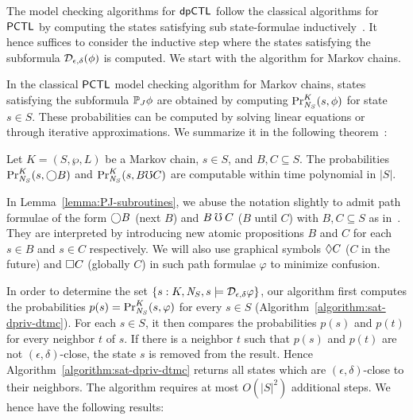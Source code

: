 
The model checking algorithms for $\dpCTL$ follow the classical
algorithms for $\PCTL$ by computing the states satisfying 
sub state-formulae inductively~\cite{BK:08:PMC}. It hence suffices to
consider the inductive step where the states satisfying the subformula 
$\dpriv{\epsilon}{\delta} (\phi)$ is computed. We start with the
algorithm for Markov chains.

In the classical $\PCTL$ model checking algorithm for Markov chains,
states satisfying the subformula $\PJ{J} \phi$ are obtained by
computing $\myPr{s}{K}{\neighbor{S}}{\phi}$ for state $s \in S$. 
These probabilities can be computed by solving linear equations or
through iterative approximations. We summarize it in the following
theorem~\cite{BK:08:PMC}:

\begin{lemma}
  Let $K = (S, \wp, L)$ be a Markov chain, $s
  \in S$, and $B, C \subseteq S$. The probabilities
  $\myPr{s}{K}{\neighbor{S}}{\gX B}$ and
  $\myPr{s}{K}{\neighbor{S}}{B \mho C}$
\hide{
  $\Pr[\{ \pi : K, \neighbor{K}, \pi \models B \buntil{n} C \textmd{
    with } \pi_0 = s \}]$ 
} are computable within time polynomial in
  $|S|$.
  \label{lemma:PJ-subroutines}
\end{lemma}

In Lemma~\ref{lemma:PJ-subroutines}, we abuse the notation slightly to
admit path formulae of the form $\gX B$ (next $B$) and
$B \guntil C$ ($B$ until $C$) with $B, C \subseteq S$ as
in~\cite{BK:08:PMC}. They are interpreted by introducing new atomic
propositions $B$ and $C$ for each $s \in B$ and $s \in C$
respectively. We will also use graphical symbols $\gF C$ ($C$ in
the future) and $\gG C$ (globally $C$) in such path formulae
$\varphi$ to minimize confusion.  

In order to determine the set $\{ s : K, \neighbor{S}, s \models
\dpriv{\epsilon}{\delta} \varphi \}$, our algorithm first computes
the probabilities $p (s) = \myPr{s}{K}{\neighbor{S}}{\varphi}$ for every
$s \in S$ (Algorithm~\ref{algorithm:sat-dpriv-dtmc}). For each $s \in S$,
it then compares the probabilities $p (s)$ and $p (t)$ for every
neighbor $t$ of $s$. If there is a neighbor $t$ such that $p (s)$ and
$p (t)$ are not $(\epsilon, \delta)$-close, the state $s$
is removed from the result. Hence
Algorithm~\ref{algorithm:sat-dpriv-dtmc} returns all states which are
$(\epsilon, \delta)$-close to their neighbors. 
The algorithm requires at most $O
(|S|^2)$ additional steps. We hence have the following results:

